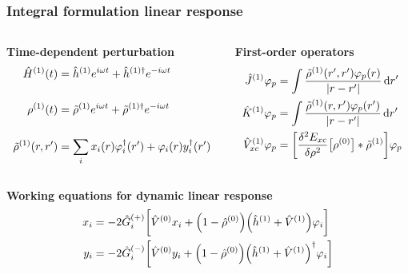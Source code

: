 \begin{frame}
\frametitle{Integral formulation linear response}

\begin{columns}
\begin{column}[b]{0.48\linewidth}
\centering
\textbf{Time-dependent perturbation}
\begin{align}
    \nonumber
    \hat{H}^{(1)}(t) &= 
    \hat{h}^{(1)}e^{i\omega t} +
    \hat{h}^{(1)\dag}e^{-i\omega t}\\
    \nonumber
    &\ \\
    \nonumber
    \rho^{(1)}(t) &= 
    \tilde{\rho}^{(1)}e^{i\omega t} +
    \tilde{\rho}^{(1)\dag}e^{-i\omega t}\\
    \nonumber
    &\ \\
    \nonumber
    \tilde{\rho}^{(1)}(r,r') &= 
    \sum_i x_i(r)\varphi_i^\dag(r') + \varphi_i(r)y_i^\dag(r')
\end{align}
\end{column}

\begin{column}[b]{0.48\linewidth}
\centering
\textbf{First-order operators}
\begin{align}
    \nonumber
    \hat{J}^{(1)} \varphi_p &=
        \int\frac{\tilde{\rho}^{(1)}(r',r')\varphi_p(r)}{|r-r'|} \,\mathrm{d} r' \\
    \nonumber
    \hat{K}^{(1)} \varphi_p &=
        \int\frac{\tilde{\rho}^{(1)}(r,r')\varphi_p(r')}{|r-r'|} \,\mathrm{d} r' \\
    \nonumber
    \hat{V}_{xc}^{(1)} \varphi_p &= 
        \bigg[\frac{\delta^2 E_{xc}}{\delta \rho^2}
        \big[\rho^{(0)}\big]*\tilde{\rho}^{(1)}\bigg] \varphi_p
\end{align}
\end{column}
\end{columns}

\vspace{7mm}
\centering
\textbf{Working equations for dynamic linear response}
\begin{align}
    \nonumber
    x_i &= -2 \hat{G}_i^{(+)}\bigg[
    \hat{V}^{(0)}x_i +
    \Big(1 - \hat{\rho}^{(0)}\Big)
    \Big(\hat{h}^{(1)} + \hat{V}^{(1)}\Big)\varphi_i\bigg]\\
    \nonumber
    y_i &= -2 \hat{G}_i^{(-)}\bigg[
    \hat{V}^{(0)}y_i +
    \Big(1 - \hat{\rho}^{(0)}\Big)
    \Big(\hat{h}^{(1)} + \hat{V}^{(1)}\Big)^\dag\varphi_i\bigg]
\end{align}



\end{frame}
